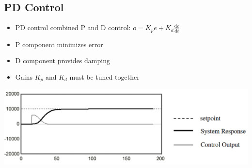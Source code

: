 \documentclass[10pt]{article}
\newcommand{\dd}{\text{d}}
\begin{document}
\subsection*{PD Control}
\begin{itemize}
	\item PD control combined P and D control: $o = K_p e + K_d \frac{\dd e}{\dd t}$
	\item P component minimizes error
	\item D component provides damping
	\item Gains $K_p$ and $K_d$ must be tuned together
\end{itemize}
\begin{center} 
	\includegraphics*[width=\textwidth]{L2_14.png} 
\end{center}
\end{document}
